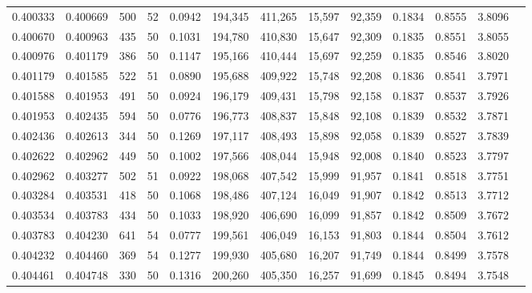 \begin{tabular}{rrrrrrrrrrrrr}
0.400333 & 0.400669 &   500 &  52 &                                     0.0942 & 194,345 & 411,265 &  15,597 &  92,359 & 0.1834 & 0.8555 & 3.8096 \\
0.400670 & 0.400963 &   435 &  50 &                                     0.1031 & 194,780 & 410,830 &  15,647 &  92,309 & 0.1835 & 0.8551 & 3.8055 \\
0.400976 & 0.401179 &   386 &  50 &                                     0.1147 & 195,166 & 410,444 &  15,697 &  92,259 & 0.1835 & 0.8546 & 3.8020 \\
0.401179 & 0.401585 &   522 &  51 &                                     0.0890 & 195,688 & 409,922 &  15,748 &  92,208 & 0.1836 & 0.8541 & 3.7971 \\
0.401588 & 0.401953 &   491 &  50 &                                     0.0924 & 196,179 & 409,431 &  15,798 &  92,158 & 0.1837 & 0.8537 & 3.7926 \\
0.401953 & 0.402435 &   594 &  50 &                                     0.0776 & 196,773 & 408,837 &  15,848 &  92,108 & 0.1839 & 0.8532 & 3.7871 \\
0.402436 & 0.402613 &   344 &  50 &                                     0.1269 & 197,117 & 408,493 &  15,898 &  92,058 & 0.1839 & 0.8527 & 3.7839 \\
0.402622 & 0.402962 &   449 &  50 &                                     0.1002 & 197,566 & 408,044 &  15,948 &  92,008 & 0.1840 & 0.8523 & 3.7797 \\
0.402962 & 0.403277 &   502 &  51 &                                     0.0922 & 198,068 & 407,542 &  15,999 &  91,957 & 0.1841 & 0.8518 & 3.7751 \\
0.403284 & 0.403531 &   418 &  50 &                                     0.1068 & 198,486 & 407,124 &  16,049 &  91,907 & 0.1842 & 0.8513 & 3.7712 \\
0.403534 & 0.403783 &   434 &  50 &                                     0.1033 & 198,920 & 406,690 &  16,099 &  91,857 & 0.1842 & 0.8509 & 3.7672 \\
0.403783 & 0.404230 &   641 &  54 &                                     0.0777 & 199,561 & 406,049 &  16,153 &  91,803 & 0.1844 & 0.8504 & 3.7612 \\
0.404232 & 0.404460 &   369 &  54 &                                     0.1277 & 199,930 & 405,680 &  16,207 &  91,749 & 0.1844 & 0.8499 & 3.7578 \\
0.404461 & 0.404748 &   330 &  50 &                                     0.1316 & 200,260 & 405,350 &  16,257 &  91,699 & 0.1845 & 0.8494 & 3.7548 \\

\end{tabular}
